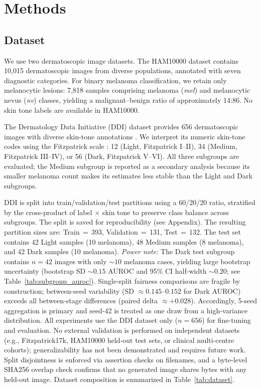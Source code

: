 \section{Methods}

\subsection{Dataset}

We use two dermatoscopic image datasets. The HAM10000 dataset \cite{Tschandl2018} contains 10,015 dermatoscopic images from diverse populations, annotated with seven diagnostic categories. For binary melanoma classification, we retain only melanocytic lesions: 7,818 samples comprising melanoma (\emph{mel}) and melanocytic nevus (\emph{nv}) classes, yielding a malignant--benign ratio of approximately 14:86. No skin tone labels are available in HAM10000.

The Dermatology Data Initiative (DDI) dataset provides 656 dermatoscopic images with diverse skin-tone annotations \cite{DDI2021}. We interpret its numeric skin-tone codes using the Fitzpatrick scale \cite{Fitzpatrick1988}: 12 (Light, Fitzpatrick I--II), 34 (Medium, Fitzpatrick III--IV), or 56 (Dark, Fitzpatrick V--VI). All three subgroups are evaluated; the Medium subgroup is reported as a secondary analysis because its smaller melanoma count makes its estimates less stable than the Light and Dark subgroups.

DDI is split into train/validation/test partitions using a 60/20/20 ratio, stratified by the cross-product of label $\times$ skin tone to preserve class balance across subgroups. The split is saved for reproducibility (see Appendix). The resulting partition sizes are: Train\,$=$\,393, Validation\,$=$\,131, Test\,$=$\,132. The test set contains 42 Light samples (10 melanoma), 48 Medium samples (8 melanoma), and 42 Dark samples (10 melanoma). \emph{Power note:} The Dark test subgroup contains $n=42$ images with only $\sim 10$ melanoma cases, yielding large bootstrap uncertainty (bootstrap SD $\sim 0.15$ AUROC and 95\% CI half-width $\sim 0.20$; see Table~\ref{tab:subgroup_auroc}). Single-split fairness comparisons are fragile by construction; between-seed variability (SD $\approx 0.145$--$0.152$ for Dark AUROC) exceeds all between-stage differences (paired delta $\approx +0.028$). Accordingly, 5-seed aggregation is primary and seed-42 is treated as one draw from a high-variance distribution. All experiments use the DDI dataset only ($n=656$) for fine-tuning and evaluation. No external validation is performed on independent datasets (e.g., Fitzpatrick17k, HAM10000 held-out test sets, or clinical multi-centre cohorts); generalizability has not been demonstrated and requires future work. Split disjointness is enforced via assertion checks on filenames, and a byte-level SHA256 overlap check confirms that no generated image shares bytes with any held-out image. Dataset composition is summarized in Table~\ref{tab:dataset}.

